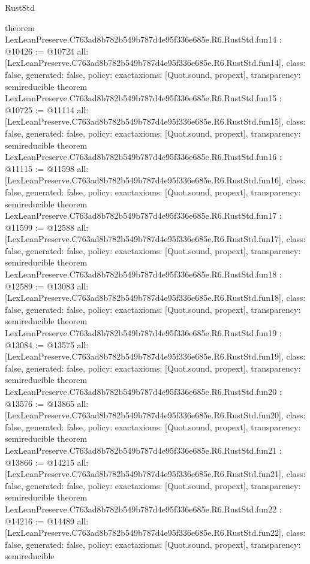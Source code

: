\begin{lexlean}{RustStd}
\begin{coremodule}
{}
theorem LexLeanPreserve.C763ad8b782b549b787d4e95f336e685e.R6.RustStd.fun14 : @10426 := @10724 {
  all: [LexLeanPreserve.C763ad8b782b549b787d4e95f336e685e.R6.RustStd.fun14],
  class: false,
  generated: false,
  policy: exact{axioms: [Quot.sound, propext]},
  transparency: semireducible
}
theorem LexLeanPreserve.C763ad8b782b549b787d4e95f336e685e.R6.RustStd.fun15 : @10725 := @11114 {
  all: [LexLeanPreserve.C763ad8b782b549b787d4e95f336e685e.R6.RustStd.fun15],
  class: false,
  generated: false,
  policy: exact{axioms: [Quot.sound, propext]},
  transparency: semireducible
}
theorem LexLeanPreserve.C763ad8b782b549b787d4e95f336e685e.R6.RustStd.fun16 : @11115 := @11598 {
  all: [LexLeanPreserve.C763ad8b782b549b787d4e95f336e685e.R6.RustStd.fun16],
  class: false,
  generated: false,
  policy: exact{axioms: [Quot.sound, propext]},
  transparency: semireducible
}
theorem LexLeanPreserve.C763ad8b782b549b787d4e95f336e685e.R6.RustStd.fun17 : @11599 := @12588 {
  all: [LexLeanPreserve.C763ad8b782b549b787d4e95f336e685e.R6.RustStd.fun17],
  class: false,
  generated: false,
  policy: exact{axioms: [Quot.sound, propext]},
  transparency: semireducible
}
theorem LexLeanPreserve.C763ad8b782b549b787d4e95f336e685e.R6.RustStd.fun18 : @12589 := @13083 {
  all: [LexLeanPreserve.C763ad8b782b549b787d4e95f336e685e.R6.RustStd.fun18],
  class: false,
  generated: false,
  policy: exact{axioms: [Quot.sound, propext]},
  transparency: semireducible
}
theorem LexLeanPreserve.C763ad8b782b549b787d4e95f336e685e.R6.RustStd.fun19 : @13084 := @13575 {
  all: [LexLeanPreserve.C763ad8b782b549b787d4e95f336e685e.R6.RustStd.fun19],
  class: false,
  generated: false,
  policy: exact{axioms: [Quot.sound, propext]},
  transparency: semireducible
}
theorem LexLeanPreserve.C763ad8b782b549b787d4e95f336e685e.R6.RustStd.fun20 : @13576 := @13865 {
  all: [LexLeanPreserve.C763ad8b782b549b787d4e95f336e685e.R6.RustStd.fun20],
  class: false,
  generated: false,
  policy: exact{axioms: [Quot.sound, propext]},
  transparency: semireducible
}
theorem LexLeanPreserve.C763ad8b782b549b787d4e95f336e685e.R6.RustStd.fun21 : @13866 := @14215 {
  all: [LexLeanPreserve.C763ad8b782b549b787d4e95f336e685e.R6.RustStd.fun21],
  class: false,
  generated: false,
  policy: exact{axioms: [Quot.sound, propext]},
  transparency: semireducible
}
theorem LexLeanPreserve.C763ad8b782b549b787d4e95f336e685e.R6.RustStd.fun22 : @14216 := @14489 {
  all: [LexLeanPreserve.C763ad8b782b549b787d4e95f336e685e.R6.RustStd.fun22],
  class: false,
  generated: false,
  policy: exact{axioms: [Quot.sound, propext]},
  transparency: semireducible
}
\end{coremodule}
\end{lexlean}
